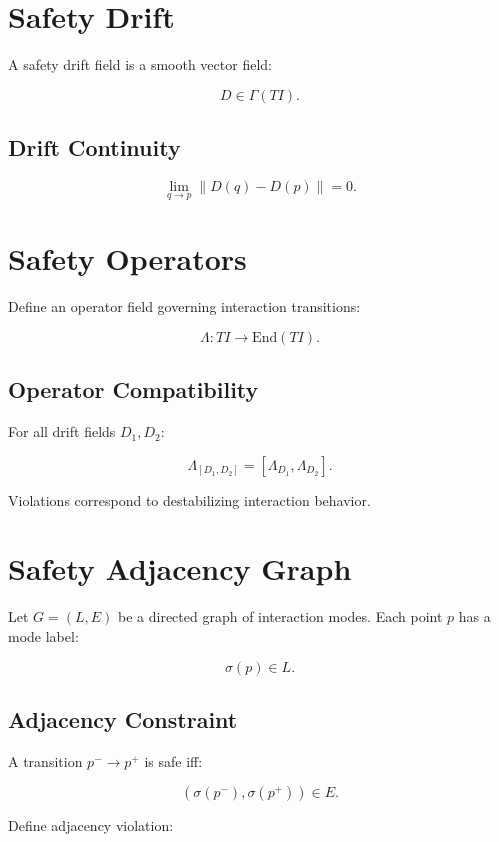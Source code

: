 \documentclass[11pt]{article}
\begin{document}
\section{Safety Drift}

A safety drift field is a smooth vector field:

\[
D \in \Gamma(TI).
\]

\subsection{Drift Continuity}

\[
\lim_{q \to p} \|D(q) - D(p)\| = 0.
\]

\section{Safety Operators}

Define an operator field governing interaction transitions:

\[
\Lambda : TI \to \mathrm{End}(TI).
\]

\subsection{Operator Compatibility}

For all drift fields $D_1, D_2$:

\[
\Lambda_{[D_1, D_2]} = [\Lambda_{D_1}, \Lambda_{D_2}].
\]

Violations correspond to destabilizing interaction behavior.

\section{Safety Adjacency Graph}

Let $G = (L, E)$ be a directed graph of interaction modes. Each point $p$ has a
mode label:

\[
\sigma(p) \in L.
\]

\subsection{Adjacency Constraint}

A transition $p^- \to p^+$ is safe iff:

\[
(\sigma(p^-), \sigma(p^+)) \in E.
\]

Define adjacency violation:
\end{document}
